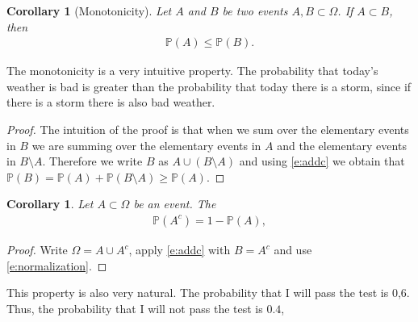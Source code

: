 \documentclass[12pt]{article}
\newtheorem{corollary}[theorem]{Corollary}
\newcommand{\<}{{\langle \!\! \langle}}
\renewcommand{\>}{{\rangle \!\! \rangle}}
\newcommand{\bel}[2]{\begin{equation} \label{#1} \begin{split} #2
 					\end{split} \end{equation}}
\begin{document}
\begin{corollary}[Monotonicity]
	\label{} Let $A$ and $B$ be two events $A,B\subset\Omega$. If $A\subset B$, then 
\bel{}{\mathbb{P}(A)\leq\mathbb{P}(B).}
\end{corollary}
The monotonicity is a very intuitive property. The probability that today's weather is bad is greater than the probability that today there is a storm, since if there is a storm there is also bad weather.  
\begin{proof}
	The intuition of the proof is that when we sum over the elementary events in $B$ we are summing over the elementary events in $A$ and the elementary events in $B\setminus A$. Therefore we write $B$ as $A\cup (B\setminus A)$ and using \eqref{e:addc} we obtain that $\mathbb{P}(B) = \mathbb{P}(A)+\mathbb{P}(B\setminus A) \geq \mathbb{P}(A)$.
\end{proof}
\begin{corollary} \label{}
Let $A\subset \Omega$ be an event. The 
\bel{e:compl}{\mathbb{P}(A^c)=1-\mathbb{P}(A),}
\end{corollary}
\begin{proof}
	Write $\Omega = A \cup A^c $, apply \eqref{e:addc} with $B=A^c$ and use \eqref{e:normalization}.
\end{proof}
This property is also very natural. The probability that I will pass the test is 0,6. Thus, the probability that I will not pass the test is $0.4$,
\end{document}

